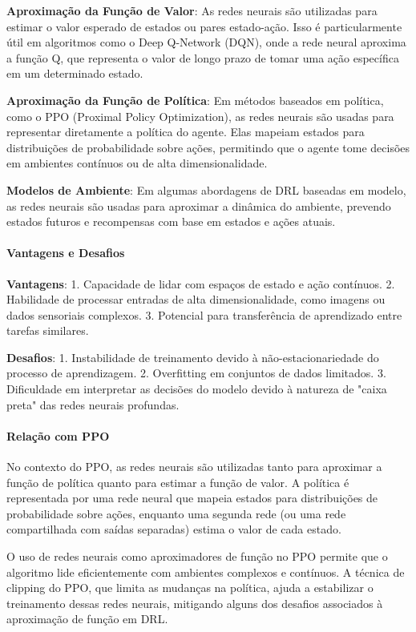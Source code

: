 \textbf{Aproximação da Função de Valor}: As redes neurais são utilizadas para estimar o valor esperado de estados ou pares estado-ação. Isso é particularmente útil em algoritmos como o Deep Q-Network (DQN), onde a rede neural aproxima a função Q, que representa o valor de longo prazo de tomar uma ação específica em um determinado estado.

\textbf{Aproximação da Função de Política}: Em métodos baseados em política, como o PPO (Proximal Policy Optimization), as redes neurais são usadas para representar diretamente a política do agente. Elas mapeiam estados para distribuições de probabilidade sobre ações, permitindo que o agente tome decisões em ambientes contínuos ou de alta dimensionalidade.

\textbf{Modelos de Ambiente}: Em algumas abordagens de DRL baseadas em modelo, as redes neurais são usadas para aproximar a dinâmica do ambiente, prevendo estados futuros e recompensas com base em estados e ações atuais.

\paragraph{Vantagens e Desafios}

\textbf{Vantagens}:
1. Capacidade de lidar com espaços de estado e ação contínuos.
2. Habilidade de processar entradas de alta dimensionalidade, como imagens ou dados sensoriais complexos.
3. Potencial para transferência de aprendizado entre tarefas similares.

\textbf{Desafios}:
1. Instabilidade de treinamento devido à não-estacionariedade do processo de aprendizagem.
2. Overfitting em conjuntos de dados limitados.
3. Dificuldade em interpretar as decisões do modelo devido à natureza de "caixa preta" das redes neurais profundas.

\paragraph{Relação com PPO}

No contexto do PPO, as redes neurais são utilizadas tanto para aproximar a função de política quanto para estimar a função de valor. A política é representada por uma rede neural que mapeia estados para distribuições de probabilidade sobre ações, enquanto uma segunda rede (ou uma rede compartilhada com saídas separadas) estima o valor de cada estado.

O uso de redes neurais como aproximadores de função no PPO permite que o algoritmo lide eficientemente com ambientes complexos e contínuos. A técnica de clipping do PPO, que limita as mudanças na política, ajuda a estabilizar o treinamento dessas redes neurais, mitigando alguns dos desafios associados à aproximação de função em DRL.


